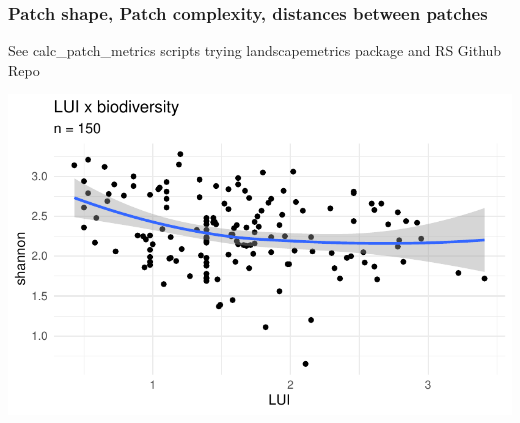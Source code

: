 \documentclass[
  letterpaper,
  DIV=11,
  numbers=noendperiod]{scrartcl}
\begin{document}
\hypertarget{patch-shape-patch-complexity-distances-between-patches}{%
\subsubsection{\texorpdfstring{\textbf{Patch shape, Patch complexity,
distances between
patches}}{Patch shape, Patch complexity, distances between patches}}\label{patch-shape-patch-complexity-distances-between-patches}}

See calc\_patch\_metrics scripts trying landscapemetrics package and RS
Github Repo

\includegraphics{Landscape_Indices_files/figure-pdf/unnamed-chunk-20-1.pdf}
\end{document}

